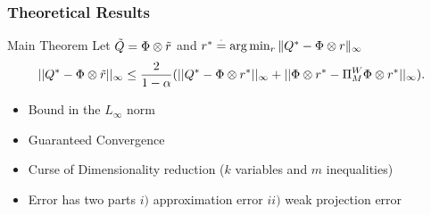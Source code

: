 \documentclass[10pt,handout]{beamer}
\begin{document}
\begin{frame}[fragile]
\frametitle{Theoretical Results}
\begin{block}{Main Theorem}
Let $\tilde{Q}=\Phi \otimes \tilde{r}$ and $r^*\stackrel{\cdot}{=}\arg\min_{r}\|Q^*-\Phi \otimes r\|_\infty$
\begin{align*}
||Q^*-\Phi\otimes \tilde{r}||_\infty\leq \frac{2}{1-\alpha}(||Q^*-\Phi\otimes r^*||_\infty+||\Phi\otimes r^*-\Pi_M^W \Phi\otimes r^*||_\infty).
\end{align*}

\begin{itemize}
\item Bound in the $L_\infty$ norm
\item Guaranteed Convergence
\item Curse of Dimensionality reduction ($k$ variables and $m$ inequalities)
\item Error has two parts $i)$ approximation error $ii)$ weak projection error
\end{itemize}

\end{block}

\end{frame}
\end{document}
